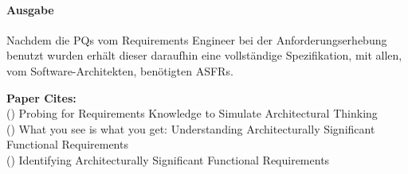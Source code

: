 \paragraph{Ausgabe}

Nachdem die PQs vom Requirements Engineer bei der Anforderungserhebung benutzt wurden erhält dieser daraufhin eine vollständige Spezifikation, mit allen, vom Software-Architekten, benötigten ASFRs.

\textbf{Paper Cites:} \\
(\cite{Ros01}) Probing for Requirements Knowledge to Simulate Architectural Thinking \\
(\cite{Ros02}) What you see is what you get: Understanding Architecturally Significant Functional Requirements \\
(\cite{Ros03}) Identifying Architecturally Significant Functional Requirements \\